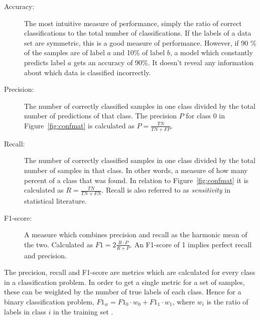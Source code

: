 \begin{description}
    \item[Accuracy:] The most intuitive measure of performance, simply the ratio of correct classifications to the total number of classifications. If the labels of a data set are symmetric, this is a good measure of performance. However, if 90 \%  of the samples are of label $a$ and 10\% of label $b$, a model which constantly predicts label $a$ gets an accuracy of 90\%. It doesn't reveal any information about which data is classified incorrectly. 
    \item[Precision:] The number of correctly classified samples in one class divided by the total number of predictions of that class. The precision $P$ for class 0 in Figure~\ref{fig:confmat} is calculated as $\displaystyle{P = \frac{TN}{TN + FP}}$. 
    \item[Recall:] The number of correctly classified samples in one class divided by the total number of samples in that class. In other words, a measure of how many percent of a class that was found. In relation to Figure~\ref{fig:confmat} it is calculated as $\displaystyle{R = \frac{TN}{TN + FN}}$. Recall is also referred to as \textit{sensitivity} in statistical literature. 
    \item[F1-score:] A measure which combines precision and recall as the harmonic mean of the two. Calculated as $\displaystyle{F1 = 2 \frac{R \cdot P}{R + P}}$. An F1-score of 1 implies perfect recall and precision.
\end{description}

The precision, recall and F1-score are metrics which are calculated for every class in a classification problem. In order to get a single metric for a set of samples, these can be weighted by the number of true labels of each class. Hence for a binary classification problem, $F1_w = F1_0 \cdot w_0 + F1_1 \cdot w_1$, where $w_i$ is the ratio of labels in class $i$ in the training set \citep{Ting2017}. 

